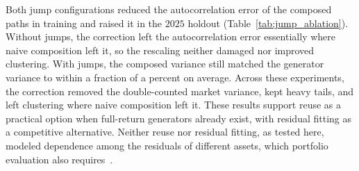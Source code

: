 Both jump configurations reduced the autocorrelation error of the
composed paths in training and raised it in the $2025$ holdout
(Table~\ref{tab:jump_ablation}). Without jumps, the correction left
the autocorrelation error essentially where naive composition left it,
so the rescaling neither damaged nor improved clustering. With jumps,
the composed variance still matched the generator variance to within a
fraction of a percent on average. Across these experiments, the
correction removed the double-counted market variance, kept heavy
tails, and left clustering where naive composition left it. These
results support reuse as a practical option when full-return
generators already exist, with residual fitting as a competitive
alternative. Neither reuse nor residual fitting, as tested
here, modeled dependence among the residuals of different assets, which
portfolio evaluation also requires~\cite{embrechtsMcNeilStraumann2002,
boucheyNemtchinovWong2015}.
